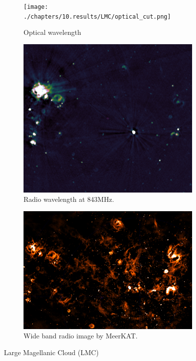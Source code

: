 \begin{figure}[h]
	\centering
	\begin{subfigure}[b]{0.3\linewidth}
		\texttt{[image: ./chapters/10.results/LMC/optical\_cut.png]}
		\caption{Optical wavelength}
	\end{subfigure}
	\begin{subfigure}[b]{0.30\linewidth}
		\includegraphics[width=1.0\linewidth]{./chapters/10.results/LMC/radio-843_cut.png}
		\caption{Radio wavelength at 843MHz.}
		\label{results:LMC:radio}
	\end{subfigure}
	\begin{subfigure}[b]{0.375\linewidth}
		\includegraphics[width=1.0\linewidth]{./chapters/10.results/LMC/meerkat2.png}
		\caption{Wide band radio image by MeerKAT.}
		\label{results:LMC:meerkat}
	\end{subfigure}
	\caption{Large Magellanic Cloud (LMC)}
	\label{results:LMC}
\end{figure}

